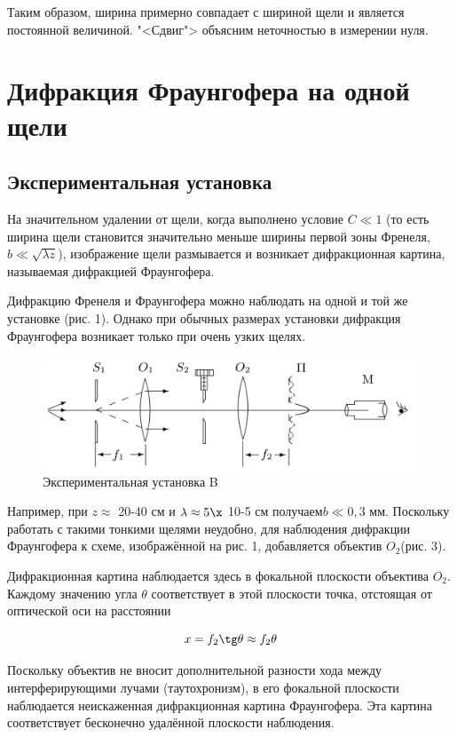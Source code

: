 \documentclass[12pt]{kiarticle} %
\begin{document}
Таким образом, ширина примерно совпадает с шириной щели и является постоянной величиной. "<Сдвиг"> объясним неточностью в измерении нуля.  

\section{Дифракция Фраунгофера на одной щели}

	\subsection{Экспериментальная установка}
	
	На значительном удалении от щели, когда выполнено условие $ C \ll 1 $
(то есть ширина щели становится значительно меньше ширины первой
зоны Френеля, $ b \ll \sqrt{\lambda z} $), изображение щели размывается и возникает
дифракционная картина, называемая дифракцией Фраунгофера.

Дифракцию Френеля и Фраунгофера можно наблюдать на одной
и той же установке (рис. 1). Однако при обычных размерах установки дифракция Фраунгофера возникает только при очень узких щелях.

	\begin{figure}[h!]
		\centering
		\includegraphics[width=0.8\linewidth]{b.png}
		\caption{Экспериментальная установка B}
		\label{labB}
	\end{figure}

Например, при $ z \approx $ 20-40 см и $  \lambda \approx 5 \x $ 10-5  см получаем$  b \ll 0,3 $ мм. Поскольку работать с такими тонкими щелями неудобно, для наблюдения дифракции Фраунгофера к схеме, изображённой на рис. 1, добавляется объектив $ O_2  $(рис. 3).

Дифракционная картина наблюдается здесь в фокальной плоскости
объектива $ O_2 $. Каждому значению угла $ \theta $ соответствует в этой плоскости точка, отстоящая от оптической оси на расстоянии

\begin{equation}\label{x}
x = f_2 \tg \theta \approx f_2 \theta
\end{equation}

Поскольку объектив не вносит дополнительной разности хода
между интерферирующими лучами (таутохронизм), в его фокальной
плоскости наблюдается неискаженная дифракционная картина Фраунгофера. Эта картина соответствует бесконечно удалённой плоскости
наблюдения.
\end{document}
